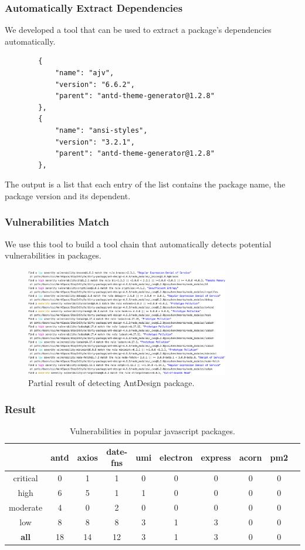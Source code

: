 \documentclass[notheorems, aspectratio=54]{beamer}
\begin{document}
\begin{frame}[fragile]
    \frametitle{Automatically Extract Dependencies}
    We developed a tool that can be used to extract a package's dependencies automatically.
    \begin{lstlisting}
        {
            "name": "ajv",
            "version": "6.6.2",
            "parent": "antd-theme-generator@1.2.8"
        },
        {
            "name": "ansi-styles",
            "version": "3.2.1",
            "parent": "antd-theme-generator@1.2.8"
        },
    \end{lstlisting}
    The output is a list that each entry of the list contains the package name, the package version and its dependent.
\end{frame}

\begin{frame}
    \frametitle{Vulnerabilities Match}
    We use this tool to build a tool chain that automatically detects potential vulnerabilities in packages.
    \begin{figure}[htbp]
        \centering
        \includegraphics[width=3.5in]{figures/tool.png}
        \centering
        \caption{Partial result of detecting AntDesign package.}
    \end{figure}

\end{frame}

\begin{frame}
    \frametitle{Result}
    \centering
     \begin{table}
      \small   
      \begin{tabular}{|c|c|c|c|c|c|c|c|c|c|} \hline
        &antd&axios&date-fns&umi&electron&express&acorn&pm2\\
        \hline
        critical&0&1&1&0&0&0&0&0\\
        \hline
        high&6&5&1&1&0&0&0&0\\
        \hline
        moderate&4&0&2&0&0&0&0&0\\
        \hline
        low&8&8&8&3&1&3&0&0\\
        \hline
        \textbf{all}&18&14&12&3&1&3&0&0\\
        \hline
      \end{tabular}
      \centering
      \caption{Vulnerabilities in popular javascript packages.}
    \end{table}
\end{frame}
\end{document}
